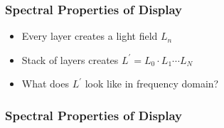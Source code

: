 \documentclass[12pt, compress]{beamer}
\begin{document}
\begin{frame}[fragile]
	\frametitle{Spectral Properties of Display}
	
	\begin{itemize}[<alert@+>]
		\item Every layer creates a light field $L_n$
		\item Stack of layers creates $L^\prime = L_0 \cdot L_1 \cdots L_N$
		\item What does $L^\prime$ look like in frequency domain?
	\end{itemize}
	
	\begin{figure}
	\end{figure}
\end{frame}

\begin{frame}[fragile]
	\frametitle{Spectral Properties of Display}
	
	\begin{figure}
		\hspace{1cm}
	\end{figure}
	
\end{frame}
\end{document}
